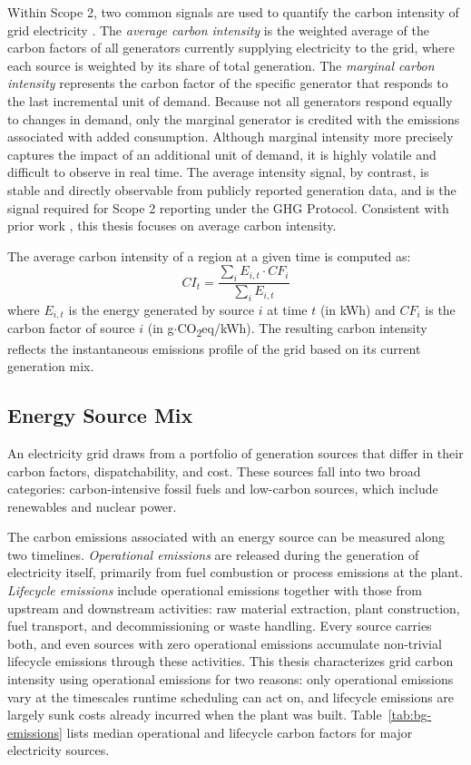 Within Scope 2, two common signals are used to quantify the carbon intensity of grid electricity \cite{sukprasert_limitations_2024}.
The \textit{average carbon intensity} is the weighted average of the carbon factors of all generators currently supplying electricity to the grid, where each source is weighted by its share of total generation.
The \textit{marginal carbon intensity} represents the carbon factor of the specific generator that responds to the last incremental unit of demand.
Because not all generators respond equally to changes in demand, only the marginal generator is credited with the emissions associated with added consumption.
Although marginal intensity more precisely captures the impact of an additional unit of demand, it is highly volatile and difficult to observe in real time.
The average intensity signal, by contrast, is stable and directly observable from publicly reported generation data, and is the signal required for Scope 2 reporting under the GHG Protocol.
Consistent with prior work \cite{maji_carboncast_2022,yan_ensembleci_2025,zhang_gnn-based_2023}, this thesis focuses on average carbon intensity.

The average carbon intensity of a region at a given time is computed as:
\begin{equation}
    CI_t = \frac{\sum_{i} E_{i,t} \cdot CF_i}{\sum_{i} E_{i,t}}
\end{equation}
where $E_{i,t}$ is the energy generated by source $i$ at time $t$ (in kWh) and $CF_i$ is the carbon factor of source $i$ (in g$\cdot$CO\textsubscript{2}eq/kWh).
The resulting carbon intensity reflects the instantaneous emissions profile of the grid based on its current generation mix.

\subsection{Energy Source Mix}


An electricity grid draws from a portfolio of generation sources that differ in their carbon factors, dispatchability, and cost.
These sources fall into two broad categories: carbon-intensive fossil fuels and low-carbon sources, which include renewables and nuclear power.

The carbon emissions associated with an energy source can be measured along two timelines.
\textit{Operational emissions} are released during the generation of electricity itself, primarily from fuel combustion or process emissions at the plant.
\textit{Lifecycle emissions} include operational emissions together with those from upstream and downstream activities: raw material extraction, plant construction, fuel transport, and decommissioning or waste handling.
Every source carries both, and even sources with zero operational emissions accumulate non-trivial lifecycle emissions through these activities.
This thesis characterizes grid carbon intensity using operational emissions for two reasons: only operational emissions vary at the timescales runtime scheduling can act on, and lifecycle emissions are largely sunk costs already incurred when the plant was built.
Table~\ref{tab:bg-emissions} lists median operational and lifecycle carbon factors for major electricity sources.

